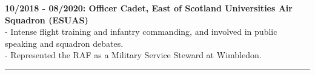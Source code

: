 \textbf{10/2018 - 08/2020: Officer Cadet, East of Scotland Universities Air Squadron (ESUAS)}\\
 - Intense flight training and infantry commanding, and involved in public speaking and squadron debates.\\
 - Represented the RAF as a Military Service Steward at Wimbledon.\\
\noindent\rule[0.5ex]{\linewidth}{1pt}


